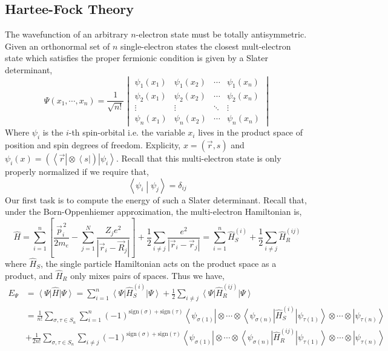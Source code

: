 \documentclass[12pt]{extarticle}
\theoremstyle{definition}
\renewcommand{\H}{\hat{H}}
\newcommand{\inner}[2]{\left< #1 \middle| #2 \right>}
\newcommand{\ket}[1]{\left| #1 \right>}
\newcommand{\bra}[1]{\left< #1 \right|}
\newcommand{\sign}[1]{\mathrm{sign}\left( #1 \right)}
\begin{document}
\subsection{Hartee-Fock Theory}

The wavefunction of an arbitrary $n$-electron state must be totally antisymmetric. Given an orthonormal set of $n$ single-electron states the closest mult-electron state which satisfies the proper fermionic condition is given by a Slater determinant,
\[ \Psi(x_1, \cdots, x_n) = \frac{1}{\sqrt{n!}} \begin{vmatrix}
\psi_1(x_1) & \psi_1 (x_2) & \cdots & \psi_1(x_n)
\\
\psi_2(x_1) & \psi_2 (x_2) & \cdots & \psi_2(x_n)
\\
\vdots & \vdots & \ddots & \vdots
\\
\psi_n(x_1) & \psi_n (x_2) & \cdots & \psi_n(x_n)
\end{vmatrix} \]
Where $\psi_i$ is the $i$-th spin-orbital i.e. the variable $x_i$ lives in the product space of position and spin degrees of freedom. Explicity, $x = (\vec{r}, s)$ and $\psi_i(x) = (\bra{\vec{r}} \otimes \bra{s}) \ket{\psi_i}$. Recall that this multi-electron state is only properly normalized if we require that,
\[ \inner{\psi_i}{\psi_j} = \delta_{ij} \]
Our first task is to compute the energy of such a Slater determinant. Recall that, under the Born-Oppenhiemer approximation, the multi-electron Hamiltonian is, 
\[ \H = \sum_{i = 1}^n \left[ \frac{\vec{p}^{\, 2}_i}{2 m_e} - \sum_{j = 1}^N \frac{Z_j e^2}{|\vec{r}_i - \vec{R}_j|} \right] + \frac{1}{2} \sum_{i \neq j} \frac{e^2}{|\vec{r}_i - \vec{r}_j|} = \sum_{i = 1}^n \H_S^{(i)} + \frac{1}{2} \sum_{i \neq j} \H_R^{(ij)} \]
where $\H_S$, the single particle Hamiltonian acts on the product space as a product, and $\H_R$ only mixes pairs of spaces. Thus we have,
\begin{align*}
E_\Psi & =  \bra{\Psi} \H \ket{\Psi} = \sum_{i = 1}^n \bra{\Psi} \H_S^{(i)} \ket{\Psi} + \frac{1}{2} \sum_{i \neq j} \bra{\Psi} \H_R^{(ij)} \ket{\Psi}
\\
& = \frac{1}{n!} \sum_{\sigma, \tau \in S_n} \sum_{i = 1}^n (-1)^{\sign{\sigma} + \sign{\tau}} \bra{\psi_{\sigma(1)}} \otimes \cdots \otimes \bra{\psi_{\sigma(n)}} \H_S^{(i)} \ket{\psi_{\tau(1)}} \otimes \cdots \otimes \ket{\psi_{\tau(n)}}
\\
& + \frac{1}{2 n!} \sum_{\sigma, \tau \in S_n} \sum_{i \neq j} (-1)^{\sign{\sigma} + \sign{\tau}} \bra{\psi_{\sigma(1)}} \otimes \cdots \otimes \bra{\psi_{\sigma(n)}} \H_R^{(ij)} \ket{\psi_{\tau(1)}} \otimes \cdots \otimes \ket{\psi_{\tau(n)}}
\end{align*}
\end{document}
